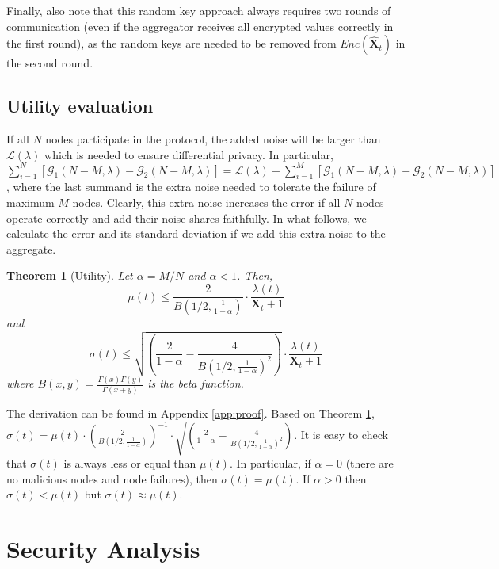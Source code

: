 \documentclass[11pt,a4paper]{article}
\theoremstyle{plain}
\theoremstyle{plain}
\newtheorem{theorem}{Theorem}
\theoremstyle{plain}
\theoremstyle{plain}
\theoremstyle{nonumberplain} \theoremseparator{}
\begin{document}
Finally, also note that this random key approach always requires two rounds of communication (even if the aggregator receives all encrypted values correctly in the first round), as the random keys are needed to be removed from $\mathit{Enc}(\hat{\mathbf{X}}_{t})$ in the second round. 


\subsection{Utility evaluation}
\label{sec:extra_noise}

If all $N$ nodes participate in the protocol, the added noise will
be larger than $\mathcal{L}(\lambda)$ which is needed to ensure differential privacy. 
In particular, $\sum_{i=1}^{N} [\mathcal{G}_{1}(N-M, \lambda) - \mathcal{G}_{2}(N-M, \lambda)] = 
\mathcal{L}(\lambda) + \sum_{i=1}^{M} [\mathcal{G}_{1}(N-M, \lambda) - \mathcal{G}_{2}(N-M, \lambda)]$, where
the last summand is the extra noise needed to tolerate the failure of maximum $M$ nodes. Clearly, this extra noise increases the error if all $N$ nodes operate correctly and add their noise shares faithfully. In what follows, we calculate the error and its standard deviation if we add this extra noise to the aggregate.


\begin{theorem}[Utility]
\label{thm:utility}
Let $\alpha = M/N$ and $\alpha < 1$. Then,
$$
\mu(t) \leq \frac{2}{B(1/2,\frac{1}{1-\alpha})} \cdot \frac{\lambda(t)}{\mathbf{X}_{t}+1}
$$ 
and 
$$ 
\sigma(t) \leq \sqrt{\left( \frac{2}{1- \alpha} - \frac{4}{B(1/2,\frac{1}{1-\alpha})^2} \right)} \cdot \frac{\lambda(t)}{\mathbf{X}_{t}+1}
$$
where $B(x,y) = \frac{\Gamma(x)\Gamma(y)}{\Gamma(x+y)}$ is the beta function.
\end{theorem}

The derivation can be found in Appendix \ref{app:proof}.  
Based on Theorem \ref{thm:utility}, 
$
\sigma(t) =  \mu(t) \cdot \left(\frac{2}{B(1/2,\frac{1}{1-\alpha})}\right)^{-1} \cdot \sqrt{\left( \frac{2}{1- \alpha} - \frac{4}{B(1/2,\frac{1}{1-\alpha})^2} \right)}
$. It is easy to check that $\sigma(t)$ is always less or equal than $\mu(t)$. In particular, if $\alpha=0$ (there are no malicious nodes and node failures), then $\sigma(t) = \mu(t)$. If $\alpha > 0$ then $\sigma(t) < \mu(t)$ but $\sigma(t) \approx \mu(t)$. 







\section{Security Analysis}
\end{document}
